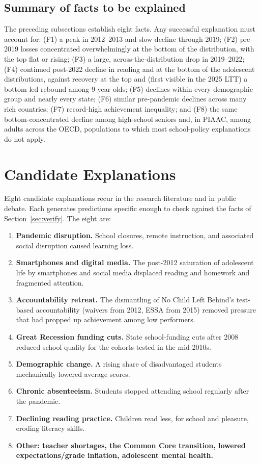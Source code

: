 \documentclass[11pt]{article}
\begin{document}
\subsection{Summary of facts to be explained}

The preceding subsections establish eight facts. Any successful explanation must account for: (F1) a peak in 2012--2013 and slow decline through 2019; (F2) pre-2019 losses concentrated overwhelmingly at the bottom of the distribution, with the top flat or rising; (F3) a large, across-the-distribution drop in 2019--2022; (F4) continued post-2022 decline in reading and at the bottom of the adolescent distributions, against recovery at the top and (first visible in the 2025 LTT) a bottom-led rebound among 9-year-olds; (F5) declines within every demographic group and nearly every state; (F6) similar pre-pandemic declines across many rich countries; (F7) record-high achievement inequality; and (F8) the same bottom-concentrated decline among high-school seniors and, in PIAAC, among adults across the OECD, populations to which most school-policy explanations do not apply.

\section{Candidate Explanations}\label{sec:candidates}

Eight candidate explanations recur in the research literature and in public debate. Each generates predictions specific enough to check against the facts of Section~\ref{sec:verify}. The eight are:

\begin{enumerate}
\item[H1.] \textbf{Pandemic disruption.} School closures, remote instruction, and associated social disruption caused learning loss.
\item[H2.] \textbf{Smartphones and digital media.} The post-2012 saturation of adolescent life by smartphones and social media displaced reading and homework and fragmented attention.
\item[H3.] \textbf{Accountability retreat.} The dismantling of No Child Left Behind's test-based accountability (waivers from 2012, ESSA from 2015) removed pressure that had propped up achievement among low performers.
\item[H4.] \textbf{Great Recession funding cuts.} State school-funding cuts after 2008 reduced school quality for the cohorts tested in the mid-2010s.
\item[H5.] \textbf{Demographic change.} A rising share of disadvantaged students mechanically lowered average scores.
\item[H6.] \textbf{Chronic absenteeism.} Students stopped attending school regularly after the pandemic.
\item[H7.] \textbf{Declining reading practice.} Children read less, for school and pleasure, eroding literacy skills.
\item[H8.] \textbf{Other: teacher shortages, the Common Core transition, lowered expectations/grade inflation, adolescent mental health.}
\end{enumerate}
\end{document}
